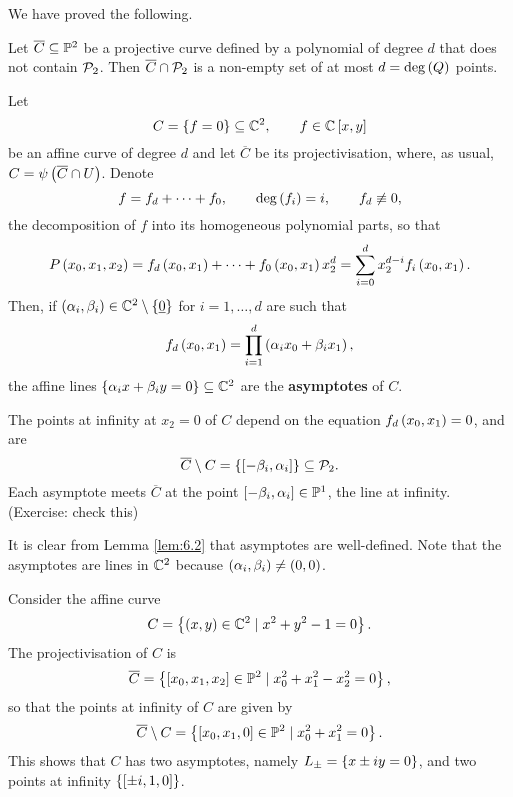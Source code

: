 We have proved the following.

\begin{theorem}
Let $ \overline{C} \subseteq \P^2 $ be a projective curve defined by a polynomial of degree $ d $ that does not contain $ \PP_2 $. Then $ \overline{C} \cap \PP_2 $ is a non-empty set of at most $ d = \deg\rb{Q} $ points.
\end{theorem}

\begin{definition}
Let
$$ C = \cb{f = 0} \subseteq \C^2, \qquad f \in \C\sb{x, y} $$
be an affine curve of degree $ d $ and let $ \overline{C} $ be its projectivisation, where, as usual, $ C = \psi\rb{\overline{C} \cap U} $. Denote
$$ f = f_d + \dots + f_0, \qquad \deg\rb{f_i} = i, \qquad f_d \not\equiv 0, $$
the decomposition of $ f $ into its homogeneous polynomial parts, so that
$$ P\rb{x_0, x_1, x_2} = f_d\rb{x_0, x_1} + \dots + f_0\rb{x_0, x_1}x_2^d = \sum_{i = 0}^d x_2^{d - i}f_i\rb{x_0, x_1}. $$
Then, if $ \rb{\alpha_i, \beta_i} \in \C^2 \setminus \cb{\underline{0}} $ for $ i = 1, \dots, d $ are such that
$$ f_d\rb{x_0, x_1} = \prod_{i = 1}^d \rb{\alpha_ix_0 + \beta_ix_1}, $$
the affine lines $ \cb{\alpha_ix + \beta_iy = 0} \subseteq \C^2 $ are the \textbf{asymptotes} of $ C $.
\end{definition}

The points at infinity at $ x_2 = 0 $ of $ C $ depend on the equation $ f_d\rb{x_0, x_1} = 0 $, and are
$$ \overline{C} \setminus C = \cb{\sb{-\beta_i, \alpha_i}} \subseteq \PP_2. $$
Each asymptote meets $ \overline{C} $ at the point $ \sb{-\beta_i, \alpha_i} \in \P^1 $, the line at infinity. (Exercise: check this)

\begin{remark}
It is clear from Lemma \ref{lem:6.2} that asymptotes are well-defined. Note that the asymptotes are lines in $ \C^2 $ because $ \rb{\alpha_i, \beta_i} \ne \rb{0, 0} $.
\end{remark}

\begin{example}
Consider the affine curve
$$ C = \cb{\rb{x, y} \in \C^2 \mid x^2 + y^2 - 1 = 0}. $$
The projectivisation of $ C $ is
$$ \overline{C} = \cb{\sb{x_0, x_1, x_2} \in \P^2 \mid x_0^2 + x_1^2 - x_2^2 = 0}, $$
so that the points at infinity of $ C $ are given by
$$ \overline{C} \setminus C = \cb{\sb{x_0, x_1, 0} \in \P^2 \mid x_0^2 + x_1^2 = 0}. $$
This shows that $ C $ has two asymptotes, namely $ L_\pm = \cb{x \pm iy = 0} $, and two points at infinity $ \cb{\sb{\pm i, 1, 0}} $.
\end{example}

